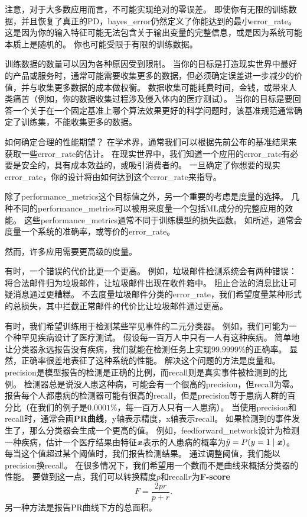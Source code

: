 注意，对于大多数应用而言，不可能实现绝对的零误差。
即使你有无限的训练数据，并且恢复了真正的\gls{PD}，\gls{bayes_error}仍然定义了你能达到的最小\gls{error_rate}。
这是因为你的输入特征可能无法包含关于输出变量的完整信息，或是因为系统可能本质上是随机的。
你也可能受限于有限的训练数据。

训练数据的数量可以因为各种原因受到限制。
当你的目标是打造现实世界中最好的产品或服务时，通常可能需要收集更多的数据，但必须确定误差进一步减少的价值，并与收集更多数据的成本做权衡。
数据收集可能耗费时间，金钱，或带来人类痛苦（例如，你的数据收集过程涉及侵入体内的医疗测试）。
当你的目标是要回答一个关于在一个固定基准上哪个算法效果更好的科学问题时，该基准规范通常确定了训练集，不能收集更多的数据。


如何确定合理的性能期望？
在学术界，通常我们可以根据先前公布的基准结果来获取一些\gls{error_rate}的估计。
在现实世界中，我们知道一个应用的\gls{error_rate}有必要是安全的，具有成本效益的，或吸引消费者的。
一旦确定了你想要的现实\gls{error_rate}，你的设计将由如何达到这个\gls{error_rate}来指导。

除了\gls{performance_metrics}这个目标值之外，另一个重要的考虑是度量的选择。
几种不同的\gls{performance_metrics}可以被用来度量一个包括\gls{ML}成分的完整应用的效能。
这些\gls{performance_metrics}通常不同于训练模型的损失函数。 
如所述，通常会度量一个系统的准确率，或等价的\gls{error_rate}。

然而，许多应用需要更高级的度量。

有时，一个错误的代价比更一个更高。
例如，垃圾邮件检测系统会有两种错误：将合法邮件归为垃圾邮件，让垃圾邮件出现在收件箱中。
阻止合法的消息比让可疑消息通过更糟糕。
不去度量垃圾邮件分类的\gls{error_rate}，我们希望度量某种形式的总损失，其中拦截正常邮件的代价比让垃圾邮件通过更高。

有时，我们希望训练用于检测某些罕见事件的二元分类器。
例如，我们可能为一个种罕见疾病设计了医疗测试。
假设每一百万人中只有一人有这种疾病。
简单地让分类器永远报告没有疾病，我们就能在检测任务上实现$99.9999\%$的正确率。
显然，正确率很差地表征了这种系统的性能。
解决这个问题的方法是度量和。
\gls{precision}是模型报告的检测是正确的比例，而\gls{recall}则是真实事件被检测到的比例。
检测器总是说没人患这种病，可能会有一个很高的\gls{precision}，但\gls{recall}为零。
报告每个人都患病的检测器可能有很高的\gls{recall}，但是\gls{precision}等于患病人群的百分比（在我们的例子是$0.0001\%$，每一百万人只有一人患病）。
当使用\gls{precision}和\gls{recall}时，通常会画\textbf{PR曲线}，y轴表示精度，x轴表示\gls{recall}。
如果检测到的事件发生了，那么分类器会生成一个更高的值。
例如，\gls{feedforward_network}设计为检测一种疾病，估计一个医疗结果由特征$\boldsymbol{\mathit{x}}$表示的人患病的概率为$\hat{y} = P(y=1\mid\boldsymbol{\mathit{x}})$。
每当这个值超过某个阈值时，我们报告检测结果。
通过调整阈值，我们能以\gls{precision}换\gls{recall}。
在很多情况下，我们希望用一个数而不是曲线来概括分类器的性能。
要做到这一点，我们可以转换精度$p$和\gls{recall}$r$为\textbf{F-score}
\begin{equation}
	F = \frac{2pr}{p+r}.
\end{equation}
另一种方法是报告PR曲线下方的总面积。

